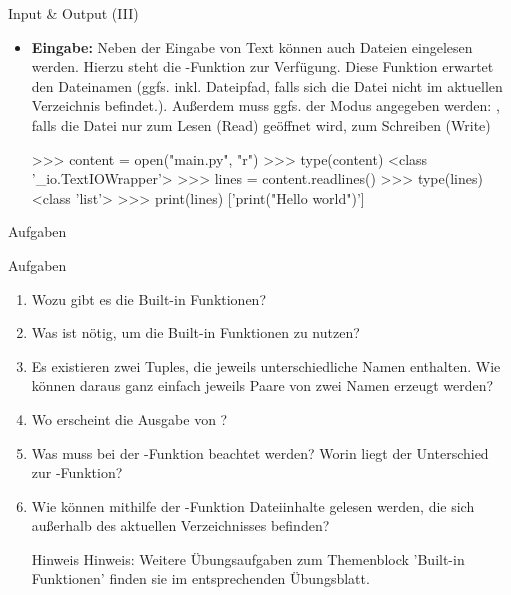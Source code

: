     \begin{frame}[fragile]{Input \& Output (III)}
        \begin{itemize}
            \item \textbf{Eingabe:} Neben der Eingabe von Text können auch Dateien eingelesen werden. Hierzu steht die -Funktion zur Verfügung. Diese Funktion erwartet den Dateinamen (ggfs. inkl. Dateipfad, falls sich die Datei nicht im aktuellen Verzeichnis befindet.). Außerdem muss ggfs. der Modus angegeben werden: , falls die Datei nur zum Lesen (Read) geöffnet wird,  zum Schreiben (Write)
            
\begin{pyconcode}
>>> content = open("main.py", "r")
>>> type(content)
<class '_io.TextIOWrapper'>
>>> lines = content.readlines()
>>> type(lines)
<class 'list'>
>>> print(lines)
['print("Hello world")\n']
\end{pyconcode}
        \end{itemize}
    \end{frame}
    
    \begin{subsection}{Aufgaben}
            \begin{frame}{Aufgaben}
                \begin{enumerate}
                    \item Wozu gibt es die Built-in Funktionen?
                    \item Was ist nötig, um die Built-in Funktionen zu nutzen?
                    \item Es existieren zwei Tuples, die jeweils unterschiedliche Namen enthalten. Wie können daraus ganz einfach jeweils Paare von zwei Namen erzeugt werden?
                    \item Wo erscheint die Ausgabe von ?
                    \item Was muss bei der -Funktion beachtet werden? Worin liegt der Unterschied zur -Funktion?
                    
                    \item Wie können mithilfe der -Funktion Dateiinhalte gelesen werden, die sich außerhalb des aktuellen Verzeichnisses befinden?
                    
                    \begin{block}{Hinweis}
                        Hinweis: Weitere Übungsaufgaben zum Themenblock 'Built-in Funktionen' finden sie im entsprechenden Übungsblatt.
                    \end{block}
                    
                    
                    
                \end{enumerate}
            \end{frame}
        \end{subsection}
    
